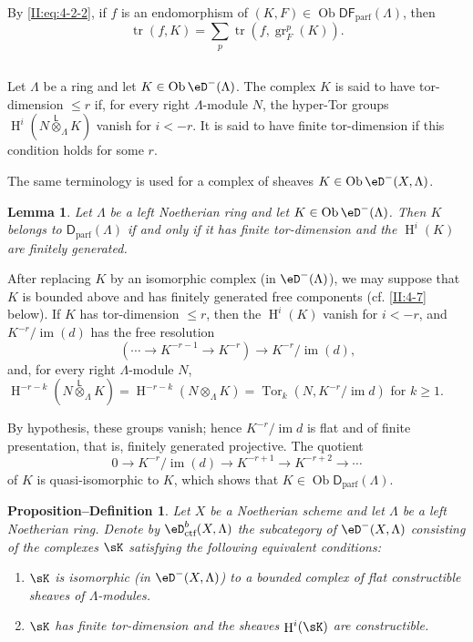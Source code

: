 \documentclass[12pt,oneside,english]{smfbook}
\DeclareMathOperator{\gr}{gr}
\DeclareMathOperator{\h}{H}
\DeclareMathOperator{\im}{im}
\DeclareMathOperator{\ob}{Ob}
\DeclareMathOperator{\tor}{Tor}
\DeclareMathOperator{\tr}{tr}
\newcommand{\lotimes}{{\overset{\mathsf{L}}{\otimes}}}
\newtheorem{lemma}[subsubsection]{Lemma}
\newtheorem{prop-def_}[subsection]{Proposition--Definition}
\begin{document}
By \eqref{II:eq:4-2-2}, if $f$ is an endomorphism of $(K,F)\in\ob\mathsf{DF}_\text{parf}(\Lambda)$, then
\begin{equation*}\tag{4.4.1}\label{II:eq:4-4-1}
 \tr(f,K) = \sum_p \tr(f,\gr_F^p(K)) \text{.}
\end{equation*}

\subsection{}\label{II:4-5}

Let $\Lambda$ be a ring and let $K\in\ob\eD^-(\Lambda)$. The complex $K$ is said to have tor-dimension $\leqslant r$ if, for every right $\Lambda$-module $N$, the hyper-Tor groups $\h^i(N\lotimes_\Lambda K)$ vanish for $i<-r$. It is said to have finite tor-dimension if this condition holds for some $r$.

The same terminology is used for a complex of sheaves $K\in\ob\eD^-(X,\Lambda)$.

\begin{lemma}\label{II:4-5-1}
Let $\Lambda$ be a left Noetherian ring and let $K\in\ob\eD^-(\Lambda)$. Then $K$ belongs to $\mathsf{D}_\text{parf}(\Lambda)$ if and only if it has finite tor-dimension and the $\h^i(K)$ are finitely generated.
\end{lemma}

After replacing $K$ by an isomorphic complex (in $\eD^-(\Lambda)$), we may suppose that $K$ is bounded above and has finitely generated free components (cf. \ref{II:4-7} below). If $K$ has tor-dimension $\leqslant r$, then the $\h^i(K)$ vanish for $i<-r$, and $K^{-r}/\im(d)$ has the free resolution
\[
  (\cdots \to K^{-r-1} \to K^{-r}) \to K^{-r}/\im(d) \text{,}
\]
and, for every right $\Lambda$-module $N$, $\h^{-r-k}(N\lotimes_\Lambda K) = \h^{-r-k}(N\otimes_\Lambda K) = \tor_k(N,K^{-r}/\im d)$ for $k\geqslant1$.

By hypothesis, these groups vanish; hence $K^{-r}/\im d$ is flat and of finite presentation, that is, finitely generated projective. The quotient
\[
  0 \to K^{-r}/\im(d) \to K^{-r+1} \to K^{-r+2}\to \cdots
\]
of $K$ is quasi-isomorphic to $K$, which shows that $K\in\ob\mathsf{D}_\text{parf}(\Lambda)$.

\begin{prop-def_}\label{II:4-6}
Let $X$ be a Noetherian scheme and let $\Lambda$ be a left Noetherian ring. Denote by $\eD_\textnormal{ctf}^b(X,\Lambda)$ the subcategory of $\eD^-(X,\Lambda)$ consisting of the complexes $\sK$ satisfying the following equivalent conditions:
\begin{enumerate}[\indent i)]
  \item $\sK$ is isomorphic (in $\eD^-(X,\Lambda)$) to a bounded complex of flat constructible sheaves of $\Lambda$-modules.
  \item $\sK$ has finite tor-dimension and the sheaves $\h^i(\sK)$ are constructible.
\end{enumerate}
\end{prop-def_}
\end{document}
